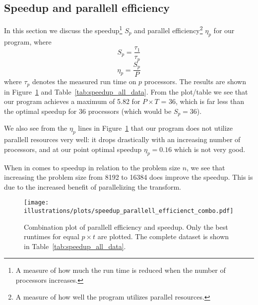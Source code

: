 
\subsection{Speedup and parallell efficiency} %
\label{sub:speedup_and_parallell_efficiency}
In this section we discuss the speedup\footnote{A measure of how much the run time is reduced when the number of processors increases.} $S_p$  and parallel efficiency\footnote{A measure of how well the program utilizes parallel resources.} $\eta_p$ for our program, where
\begin{equation}
  S_p = \frac{\tau_1}{\tau_p}
\end{equation}
\begin{equation}
  \eta_p = \frac{S_p}{P}
\end{equation}
where $\tau_p$ denotes the measured run time on $p$ processors. The results are shown in Figure~\ref{fig:plot_pe_sp} and Table~\ref{tab:speedup_all_data}. From the plot/table we see that our program achieves a maximum of 5.82 for $P\times T$ = 36, which is far less than the optimal speedup for 36 processors (which would be $S_p=36$).

We also see from the $\eta_p$ lines in Figure~\ref{fig:plot_pe_sp} that our program does not utilize parallell resources very well: it drops drastically with an increasing number of processors, and at our point optimal speedup $\eta_p=0.16$ which is not very good.

When in comes to speedup in relation to the problem size $n$, we see that increasing the problem size from 8192 to 16384 does improve the speedup. This is due to the increased benefit of parallelizing the transform.


\begin{figure}[htbp]
  \centering
  \texttt{[image: illustrations/plots/speedup\_parallell\_efficienct\_combo.pdf]}
  \caption{Combination plot of parallell efficiency and speedup. Only the best runtimes for equal $p\times t$ are plotted. The complete dataset is shown in Table~\ref{tab:speedup_all_data}.}
  \label{fig:plot_pe_sp}
\end{figure}

